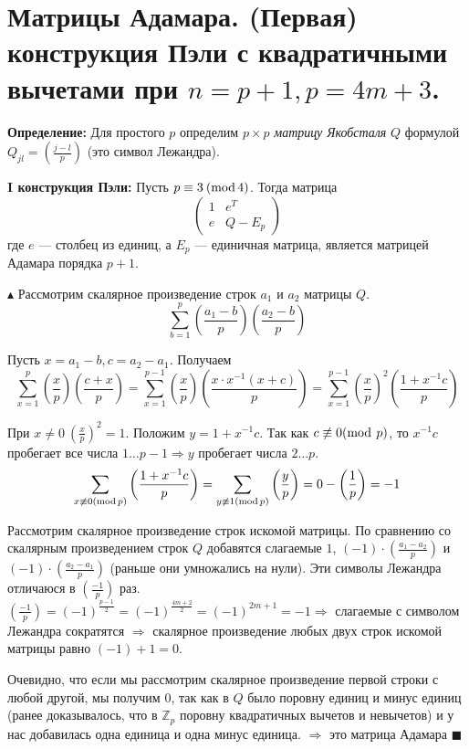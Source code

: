 \setcounter{section}{53}
\section{Матрицы Адамара. (Первая) конструкция Пэли с квадратичными вычетами при $n = p+1, p = 4m+3$.}
\par \textbf{Определение:} Для простого $p$ определим $p \times p$ \textit{матрицу Якобсталя} $Q$ формулой $Q_{jl} = (\frac{j-l}{p})$ (это символ Лежандра).
\par \textbf{I конструкция Пэли:} Пусть $p \equiv 3 \: (\operatorname{mod} 4)$. Тогда матрица
$$\left(
\begin{array}{cc}
1 & e^T\\
e &  Q-E_p
\end{array}
\right)$$
где $e$ — столбец из единиц, а $E_p$ — единичная матрица, является матрицей Адамара порядка $p + 1$.
\par $\blacktriangle$ Рассмотрим скалярное произведение строк $a_1$ и $a_2$ матрицы $Q$.
$$\sum_{b=1}^p \left(\frac{a_1-b}{p}\right)\left(\frac{a_2-b}{p}\right)$$
\par Пусть $x=a_1-b, c=a_2-a_1$. Получаем
$$\sum_{x=1}^p \left(\frac{x}{p}\right)\left(\frac{c+x}{p}\right)=\sum_{x=1}^{p-1} \left(\frac{x}{p}\right) \left(\frac{x \cdot x^{-1} (x+c)}{p}\right)=\sum_{x=1}^{p-1} \left(\frac{x}{p}\right)^2\left(\frac{1+x^{-1}c}{p}\right)$$ 
\par При $x \neq 0 \: \left(\frac{x}{p}\right)^2=1$. Положим $y=1+x^{-1}c$. Так как $c \not\equiv 0 (\operatorname{mod} \: p)$, то $x^{-1} c$ пробегает все числа $1 \ldots p-1 \Rightarrow y$ пробегает числа $2 \ldots p$. $$\sum_{x \not\equiv 0 (\operatorname{mod} p)} \left(\frac{1+x^{-1} c}{p}\right)=\sum_{y \not\equiv 1(\operatorname{mod} p)} \left(\frac{y}{p}\right)=0-\left(\frac{1}{p}\right)=-1$$
\par Рассмотрим скалярное произведение строк искомой матрицы. По сравнению со скалярным произведением строк $Q$ добавятся слагаемые $1$, $(-1)\cdot\left(\frac{a_1-a_2}{p}\right)$ и $(-1)\cdot\left(\frac{a_2-a_1}{p}\right)$ (раньше они умножались на нули). Эти символы Лежандра отличаюся в $\left( \frac{-1}{p} \right)$ раз. $\left( \frac{-1}{p} \right)=(-1)^\frac{p-1}{2}=(-1)^\frac{4m+2}{2}=(-1)^{2m+1}=-1 \Rightarrow$ слагаемые с символом Лежандра сократятся $\Rightarrow$ скалярное произведение любых двух строк искомой матрицы равно $(-1)+1=0$. 
\par Очевидно, что если мы рассмотрим скалярное произведение первой строки с любой другой, мы получим 0, так как в $Q$ было поровну единиц и минус единиц (ранее доказывалось, что в $\mathbb{Z}_p$ поровну квадратичных вычетов и невычетов) и у нас добавилась одна единица и одна минус единица. $\Rightarrow$ это матрица Адамара $\blacksquare$ 